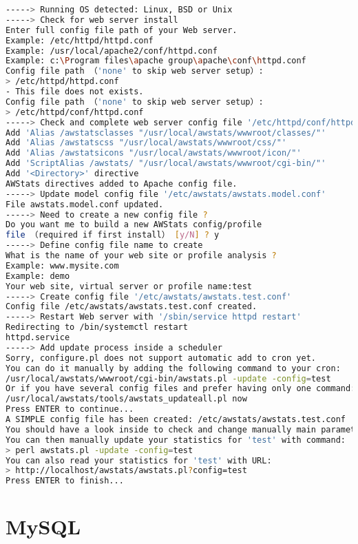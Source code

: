 \begin{lstlisting}[language=bash]
-----> Running OS detected: Linux, BSD or Unix
-----> Check for web server install
Enter full config file path of your Web server.
Example: /etc/httpd/httpd.conf
Example: /usr/local/apache2/conf/httpd.conf
Example: c:\Program files\apache group\apache\conf\httpd.conf
Config file path （'none' to skip web server setup）:
> /etc/httpd/httpd.conf
- This file does not exists.
Config file path （'none' to skip web server setup）:
> /etc/httpd/conf/httpd.conf
-----> Check and complete web server config file '/etc/httpd/conf/httpd.conf'
Add 'Alias /awstatsclasses "/usr/local/awstats/wwwroot/classes/"'
Add 'Alias /awstatscss "/usr/local/awstats/wwwroot/css/"'
Add 'Alias /awstatsicons "/usr/local/awstats/wwwroot/icon/"'
Add 'ScriptAlias /awstats/ "/usr/local/awstats/wwwroot/cgi-bin/"'
Add '<Directory>' directive
AWStats directives added to Apache config file.
-----> Update model config file '/etc/awstats/awstats.model.conf'
File awstats.model.conf updated.
-----> Need to create a new config file ?
Do you want me to build a new AWStats config/profile
file （required if first install） [y/N] ? y
-----> Define config file name to create
What is the name of your web site or profile analysis ?
Example: www.mysite.com
Example: demo
Your web site, virtual server or profile name:test
-----> Create config file '/etc/awstats/awstats.test.conf'
Config file /etc/awstats/awstats.test.conf created.
-----> Restart Web server with '/sbin/service httpd restart'
Redirecting to /bin/systemctl restart
httpd.service
-----> Add update process inside a scheduler
Sorry, configure.pl does not support automatic add to cron yet.
You can do it manually by adding the following command to your cron:
/usr/local/awstats/wwwroot/cgi-bin/awstats.pl -update -config=test
Or if you have several config files and prefer having only one command:
/usr/local/awstats/tools/awstats_updateall.pl now
Press ENTER to continue...
A SIMPLE config file has been created: /etc/awstats/awstats.test.conf
You should have a look inside to check and change manually main parameters.
You can then manually update your statistics for 'test' with command:
> perl awstats.pl -update -config=test
You can also read your statistics for 'test' with URL:
> http://localhost/awstats/awstats.pl?config=test
Press ENTER to finish...
\end{lstlisting}



\section{MySQL}

